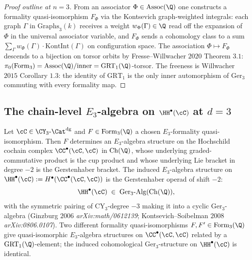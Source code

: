 \begin{proof}[Proof outline at $n = 3$]
From an associator $\Phi \in \mathrm{Assoc}(\Q)$ one constructs a
formality quasi-isomorphism $F_\Phi$ via the Kontsevich graph-weighted
integrals: each graph $\Gamma$ in $\mathrm{Graphs}_3(k)$ receives a
weight $w_\Phi(\Gamma) \in \Q$ read off the expansion of $\Phi$ in the
universal associator variable, and $F_\Phi$ sends a cohomology class to
a sum $\sum_\Gamma w_\Phi(\Gamma) \cdot \mathrm{KontInt}(\Gamma)$ on
configuration space. The association $\Phi \mapsto F_\Phi$ descends to a
bijection on torsor orbits by Fresse--Willwacher $2020$
Theorem $3.1$: $\pi_0(\mathrm{Form}_3) = \mathrm{Assoc}(\Q) /
\mathrm{inner} = \mathrm{GRT}_1(\Q)$-torsor. The freeness is Willwacher
$2015$ Corollary $1.3$: the identity of $\mathrm{GRT}_1$ is the only
inner automorphism of $\mathrm{Ger}_3$ commuting with every formality map.
\end{proof}

\subsection*{The chain-level $E_3$-algebra on $\HH^\bullet(\cC)$ at $d = 3$}

\begin{theorem}
\label{thm:chain-level-e3-algebra-hochschild-d3}
\ClaimStatusTheorem
Let $\cC \in \CY_3\text{-}\Cat^{\mathrm{dg}}$ and $F \in
\mathrm{Form}_3(\Q)$ a chosen $E_3$-formality quasi-isomorphism. Then
$F$ determines an $E_3$-algebra structure on the Hochschild cochain
complex $\CC^\bullet(\cC, \cC)$ in $\mathrm{Ch}(\Q)$, whose underlying
graded-commutative product is the cup product and whose underlying Lie
bracket in degree $-2$ is the Gerstenhaber bracket. The induced
$E_3$-algebra structure on $\HH^\bullet(\cC) := H^\bullet
(\CC^\bullet(\cC, \cC))$ is the Gerstenhaber operad of shift $-2$:
\[
 \HH^\bullet(\cC) \;\in\; \mathrm{Ger}_3\text{-}\mathrm{Alg}(\mathrm{Ch}(\Q)),
\]
with the symmetric pairing of CY$_3$-degree $-3$ making it into a
cyclic $\mathrm{Ger}_3$-algebra (Ginzburg $2006$ \textit{arXiv:math/0612139};
Kontsevich--Soibelman $2008$ \textit{arXiv:0806.0107}). Two different
formality quasi-isomorphisms $F, F' \in \mathrm{Form}_3(\Q)$ give
quasi-isomorphic $E_3$-algebra structures on $\CC^\bullet(\cC, \cC)$
related by a $\mathrm{GRT}_1(\Q)$-element; the induced cohomological
$\mathrm{Ger}_3$-structure on $\HH^\bullet(\cC)$ is identical.
\end{theorem}

